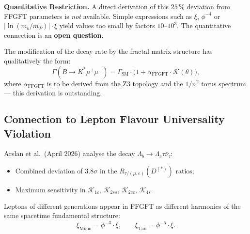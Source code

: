 \begin{warnbox}
\textbf{Quantitative Restriction.}
A direct derivation of this $25\,\%$ deviation from FFGFT parameters is
\emph{not} available. Simple expressions such as $\xi$, $\phi^{-4}$ or
$|\ln(m_b/m_P)|\cdot\xi$ yield values too small by factors $10$--$10^3$.
The quantitative connection is an \textbf{open question}.
\end{warnbox}

The modification of the decay rate by the fractal matrix structure has
qualitatively the form:
\begin{equation}
  \Gamma(B\to K^*\mu^+\mu^-)
  = \Gamma_{\text{SM}} \cdot
    \bigl(1 + \alpha_{\text{FFGFT}} \cdot \mathcal{K}(\theta)\bigr),
\end{equation}
where $\alpha_{\text{FFGFT}}$ is to be derived from the Z3 topology and
the $1/n^2$ torus spectrum — this derivation is outstanding.

\subsection{Connection to Lepton Flavour Universality Violation}

Arslan et al.\ (April 2026) \cite{Arslan2026} analyse the decay
$\Lambda_b \to \Lambda_c\tau\bar{\nu}_\tau$:
\begin{itemize}
  \item Combined deviation of $3.8\sigma$ in the
        $R_{\tau/(\mu,e)}(D^{(*)})$ ratios;
  \item Maximum sensitivity in
        $\mathcal{K}_{1c}$, $\mathcal{K}_{2ss}$, $\mathcal{K}_{2cc}$,
        $\mathcal{K}_{4s}$.
\end{itemize}

Leptons of different generations appear in FFGFT as different harmonics
of the same spacetime fundamental structure:
\begin{equation}
  \xi_{\text{Muon}} = \phi^{-3}\cdot\xi, \qquad
  \xi_{\text{Tau}}  = \phi^{-5}\cdot\xi.
\end{equation}

\begin{table}[H]
\centering
\caption{Leptons as harmonics of the fundamental frequency~$\xi$}
\smallskip
{}
\end{table}

